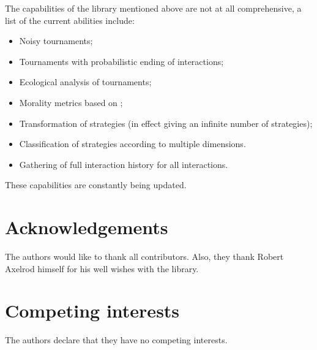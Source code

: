 \documentclass{jors}
\begin{document}
The capabilities of the library mentioned above are not at all comprehensive, a
list of the current abilities include:

\begin{itemize}[noitemsep,topsep=0pt]
    \item Noisy tournaments;
    \item Tournaments with probabilistic ending of interactions;
    \item Ecological analysis of tournaments;
    \item Morality metrics based on \cite{Singer-Clark2014};
    \item Transformation of strategies (in effect giving an infinite number of
        strategies);
    \item Classification of strategies according to multiple dimensions.
    \item Gathering of full interaction history for all interactions.
\end{itemize}

These capabilities are constantly being updated.

\section*{Acknowledgements}

The authors would like to thank all contributors. Also, they thank
Robert Axelrod himself for his well wishes with the library.

\section*{Competing interests}

The authors declare that they have no competing interests.

\printbibliography
\end{document}

